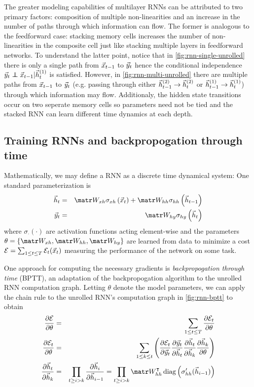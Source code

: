The greater modeling capabilities of multilayer RNNs can be attributed to two
primary factors: composition of multiple non-linearities and an increase in the
number of paths through which information can flow. The former is analogous to
the feedforward case: stacking memory cells increases the number of
non-linearities in the composite cell just like stacking multiple layers in
feedforward networks. To understand the latter point, notice that in
\autoref{fig:rnn-single-unrolled} there is only a single path from
$\vec{x}_{t-1}$ to $\vec{y}_{t}$ hence the conditional independence
$\y_{t} \independent \x_{t-1} | \h^{(1)}_t$ is satisfied.
However, in \autoref{fig:rnn-multi-unrolled} there are multiple paths from
$\vec{x}_{t-1}$ to $\vec{y}_{t}$ (e.g. passing through either
$\vec{h}^{(2)}_{t-1} \to \vec{h}^{(2)}_t$ or $\vec{h}^{(1)}_{t-1} \to
\vec{h}^{(1)}_t$) through which information may flow. Additionaly, the
hidden state transitions occur on two seperate memory cells so parameters
need not be tied and the stacked RNN can learn different time dynamics
at each depth.

\subsection{Training RNNs and backpropogation through time}

Mathematically, we may define a RNN as a discrete time dynamical system:
One standard parameterization is
\begin{eqnarray}
    \h_t &=& \W_{xh} \sigma_{xh} \left( \x_t \right) + \W_{hh} \sigma_{hh} \left( \h_{t-1} \right) \\
    \y_t &=& \W_{hy} \sigma_{hy} \left( \h_t \right) \\
\end{eqnarray}
where $\sigma_{\cdot}(\cdot)$ are activation functions acting element-wise
and the parameters $\theta = \{ \W_{xh}, \W_{hh}, \W_{hy}\}$
are learned from data to minimize a cost $\mathcal{E} = \sum_{1 \leq t \leq T}
\mathcal{E}_t(\vec{x}_t)$ measuring the performance of the network on some task.

One approach for computing the necessary gradients is \emph{backpropogation through
time} (BPTT)\cite{At}, an adaptation of the backpropogation algorithm 
to the unrolled RNN computation graph. Letting $\theta$ denote the model parameters,
we can apply the chain rule to the unrolled RNN's computation graph
in \autoref{fig:rnn-bptt} to obtain
\begin{eqnarray}
    \frac{\pd \mathcal{E}}{\pd \theta} &=& \sum_{1 \leq t \leq T} \frac{\pd \mathcal{E}_t}{\pd \theta} \\
    \frac{\pd \mathcal{E}_t}{\pd \theta} &=& \sum_{1 \leq k \leq t} \left(
        \frac{\pd \mathcal{E}_t}{\pd \y_t}
        \frac{\pd \y_t}{\pd \h_t}
        \frac{\pd \h_t}{\pd \h_k}
        \frac{\pd \h_k}{\pd \theta}
    \right) \label{eq:error-t}\\
    \frac{\pd \h_t}{\pd \h_k} &=&
    \prod_{t \geq i > k} \frac{\pd \h_i}{\pd \h_{i-1}}
    = \prod_{t \geq i > k} \W_{hh}^\tp \diag \left( \sigma_{hh}'( \h_{i-1} ) \right)
    \label{eq:error-transfer}
\end{eqnarray}

